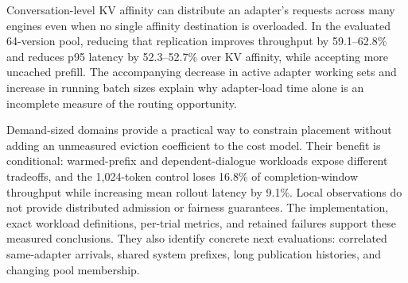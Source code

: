 Conversation-level KV affinity can distribute an adapter's requests across many
engines even when no single affinity destination is overloaded. In the evaluated
64-version pool, reducing that replication improves throughput by
59.1--62.8\% and reduces p95 latency by 52.3--52.7\% over KV affinity, while
accepting more uncached prefill. The accompanying decrease in active adapter
working sets and increase in running batch sizes explain why adapter-load time
alone is an incomplete measure of the routing opportunity.

Demand-sized domains provide a practical way to constrain placement without
adding an unmeasured eviction coefficient to the cost model. Their benefit is
conditional: warmed-prefix and dependent-dialogue workloads expose different
tradeoffs, and the 1,024-token control loses 16.8\% of completion-window
throughput while increasing mean rollout latency by 9.1\%. Local observations
do not provide distributed admission or
fairness guarantees. The implementation, exact workload definitions, per-trial
metrics, and retained failures support these measured conclusions. They also
identify concrete next evaluations: correlated same-adapter arrivals, shared
system prefixes, long publication histories, and changing pool membership.
